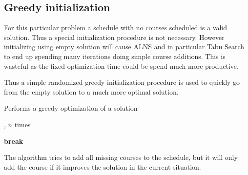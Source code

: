\subsection{Greedy initialization}

For this particular problem a schedule with no courses scheduled is a valid solution. Thus a special initialization procedure is not necessary. However initializing using empty solution will cause ALNS and in particular Tabu Search to end up spending many iterations doing simple course additions. This is wasteful as the fixed optimization time could be spend much more productive.

Thus a simple randomized greedy initialization procedure is used to quickly go from the empty solution to a much more optimal solution.

\begin{algorithm}[H]
  \caption{Performs a greedy optimization of a solution}
  \begin{algorithmic}[1]
       
        \State {}, $n$ times
      \EndFor
      \State
      
       
      \State
    
          \State
            \State {} 
            \State \textbf{break}
          \Else
            \State {} 
          \EndIf
        \EndFor
      \EndFor
    \EndFunction
  \end{algorithmic}
\end{algorithm}

The algorithm tries to add all missing courses to the schedule, but it will only add the course if it improves the solution in the current situation.
